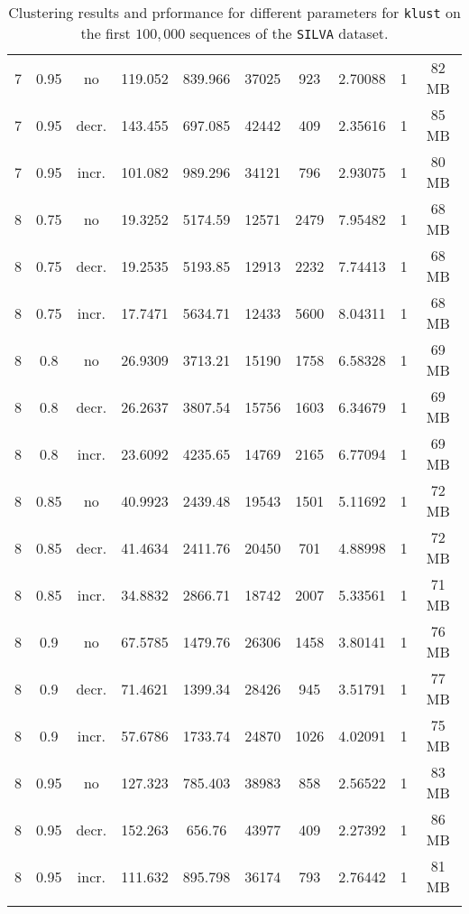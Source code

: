 \begin{longtable}{c|c|c|c|c|c|c|c|c|c}
  \hline
  7  &  0.95  & no    & 119.052  &  839.966 &  37025  &  923   &  2.70088  &  1  & 82  MB \\
  7  &  0.95  & decr. & 143.455  &  697.085 &  42442  &  409   &  2.35616  &  1  & 85  MB \\
  7  &  0.95  & incr. & 101.082  &  989.296 &  34121  &  796   &  2.93075  &  1  & 80  MB \\
  \hline
  8  &  0.75  & no    & 19.3252  &  5174.59 &  12571  &  2479  &  7.95482  &  1  & 68  MB \\
  8  &  0.75  & decr. & 19.2535  &  5193.85 &  12913  &  2232  &  7.74413  &  1  & 68  MB \\
  8  &  0.75  & incr. & 17.7471  &  5634.71 &  12433  &  5600  &  8.04311  &  1  & 68  MB \\
  \hline
  8  &  0.8   & no    & 26.9309  &  3713.21 &  15190  &  1758  &  6.58328  &  1  & 69  MB \\
  8  &  0.8   & decr. & 26.2637  &  3807.54 &  15756  &  1603  &  6.34679  &  1  & 69  MB \\
  8  &  0.8   & incr. & 23.6092  &  4235.65 &  14769  &  2165  &  6.77094  &  1  & 69  MB \\
  \hline
  8  &  0.85  & no    & 40.9923  &  2439.48 &  19543  &  1501  &  5.11692  &  1  & 72  MB \\
  8  &  0.85  & decr. & 41.4634  &  2411.76 &  20450  &  701   &  4.88998  &  1  & 72  MB \\
  8  &  0.85  & incr. & 34.8832  &  2866.71 &  18742  &  2007  &  5.33561  &  1  & 71  MB \\
  \hline
  8  &  0.9   & no    & 67.5785  &  1479.76 &  26306  &  1458  &  3.80141  &  1  & 76  MB \\
  8  &  0.9   & decr. & 71.4621  &  1399.34 &  28426  &  945   &  3.51791  &  1  & 77  MB \\
  8  &  0.9   & incr. & 57.6786  &  1733.74 &  24870  &  1026  &  4.02091  &  1  & 75  MB \\
  \hline
  8  &  0.95  & no    & 127.323  &  785.403 &  38983  &  858   &  2.56522  &  1  & 83  MB \\
  8  &  0.95  & decr. & 152.263  &  656.76  &  43977  &  409   &  2.27392  &  1  & 86  MB \\
  8  &  0.95  & incr. & 111.632  &  895.798 &  36174  &  793   &  2.76442  &  1  & 81  MB \\
  \caption{Clustering results and prformance for different parameters for
    \texttt{klust} on the first $100,000$ sequences of the \texttt{SILVA} dataset.}
  \label{fig:klust_results_params}
\end{longtable}
\endgroup


